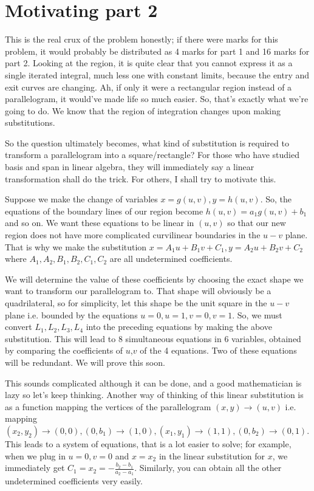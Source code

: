 \documentclass{article}
\begin{document}
\section{Motivating part 2}

This is the real crux of the problem honestly; if there were marks for this problem, it would probably be distributed as 4 marks for part 1 and 16 marks for part 2. Looking at the region, it is quite clear that you cannot express it as a single iterated integral, much less one with constant limits, because the entry and exit curves are changing. Ah, if only it were a rectangular region instead of a parallelogram, it would've made life so much easier. So, that's exactly what we're going to do. We know that the region of integration changes upon making substitutions. 
\newline

So the question ultimately becomes, what kind of substitution is required to transform a parallelogram into a square/rectangle? For those who have studied basis and span in linear algebra, they will immediately say a linear transformation shall do the trick. For others, I shall try to motivate this.
\newline

Suppose we make the change of variables $x=g(u,v),y=h(u,v)$. So, the equations of the boundary lines of our region become $h(u,v)=a_1g(u,v)+b_1$ and so on. We want these equations to be linear in $(u,v)$ so that our new region does not have more complicated curvilinear boundaries in the $u-v$ plane. That is why we make the substitution $x=A_1u+B_1v+C_1,y=A_2u+B_2v+C_2$  where $A_1,A_2,B_1,B_2,C_1,C_2$ are all undetermined coefficients. 
\newline

We will determine the value of these coefficients by choosing the exact shape we want to transform our parallelogram to. That shape will obviously be a quadrilateral, so for simplicity, let this shape be the unit square in the $u-v$ plane i.e. bounded by the equations $u=0,u=1,v=0,v=1$. So, we must convert $L_1,L_2,L_3,L_4$ into the preceding equations by making the above substitution. This will lead to $8$ simultaneous equations in $6$ variables, obtained by comparing the coefficients of $u$,$v$ of the 4 equations. Two of these equations will be redundant. We will prove this soon.
\newline

This sounds complicated although it can be done, and a good mathematician is lazy so let's keep thinking. Another way of thinking of this linear substitution is as a function mapping the vertices of the parallelogram $(x,y) \to (u,v)$ i.e. mapping $(x_2,y_2) \to (0,0),(0,b_1) \to (1,0),(x_1,y_1) \to (1,1), (0,b_2) \to (0,1)$. This leads to a system of equations, that is a lot easier to solve; for example, when we plug in $u=0,v=0$ and $x=x_2$ in the linear substitution for $x$, we immediately get $C_1=x_2=-\displaystyle \frac{b_2-b_1}{a_2-a_1}$. Similarly, you can obtain all the other undetermined coefficients very easily.
\newline
\end{document}
